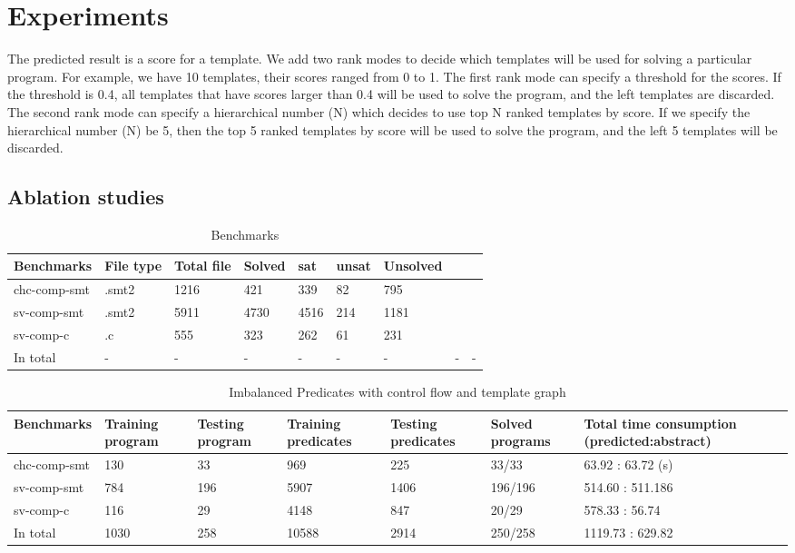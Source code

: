 \documentclass{article}
\begin{document}
\section{Experiments}
The predicted result is a score for a template. We add two rank modes to decide which templates will be used for solving a particular program. For example, we have 10 templates, their scores ranged from 0 to 1. The first rank mode can specify a threshold for the scores. If the threshold is 0.4, all templates that have scores larger than 0.4 will be used to solve the program, and the left templates are discarded. The second rank mode can specify a hierarchical number (N) which decides to use top N ranked templates by score. If we specify the hierarchical number (N) be 5, then the top 5 ranked templates by score will be used to solve the program, and the left 5 templates will be discarded.

\subsection{Ablation studies}



\begin{table}\caption{Benchmarks}
\begin{center}
\begin{tabular}{lp{1cm}p{1cm}p{1.5cm}p{1.5cm}p{1.5cm}p{1.5cm}p{1.5cm}p{1.5cm}}
\hline
Benchmarks & File type & Total file & Solved & sat & unsat & Unsolved  \\
\hline
chc-comp-smt & .smt2 & 1216 & 421  & 339  & 82    & 795 \\
sv-comp-smt &.smt2   & 5911 & 4730 & 4516 & 214  & 1181 \\
sv-comp-c &.c        & 555  & 323  & 262  & 61   & 231 \\
In total  & - & - & -&-&-&-&-&-\\
\hline
\end{tabular}
\end{center}
\end{table}


\begin{table}[h]
\begin{center}\caption{Imbalanced Predicates with control flow and template graph}
\begin{tabular}{lp{1.5cm}p{2cm}p{2cm}p{1.5cm}p{1.5cm}p{2.5cm}}
\hline
Benchmarks  & Training program &Testing program&Training  predicates & Testing predicates & Solved programs & Total time consumption (predicted:abstract)\\
\hline
chc-comp-smt  & 130 & 33& 969 & 225 & 33/33 & 63.92 : 63.72 (s)\\
sv-comp-smt  &784 &196 & 5907 & 1406 & 196/196 & 514.60 : 511.186 \\
sv-comp-c  &116 & 29  & 4148 & 847 & 20/29 &  578.33 : 56.74  \\
In total  & 1030 & 258 & 10588 & 2914 & 250/258 & 1119.73 : 629.82 \\
\hline
\end{tabular}
\end{center}
\end{table}
\end{document}
